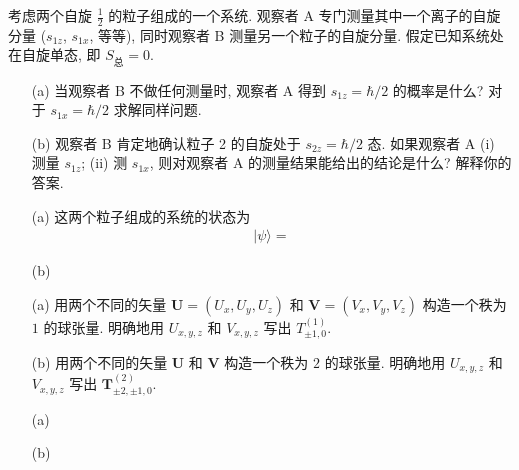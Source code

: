 \documentclass{assignment}
\begin{document}
\begin{prob}[课本习题 3.28]
    考虑两个自旋 $\frac{1}{2}$ 的粒子组成的一个系统. 观察者 A 专门测量其中一个离子的自旋分量 ($s_{1z}$, $s_{1x}$, 等等), 同时观察者 B 测量另一个粒子的自旋分量. 假定已知系统处在自旋单态, 即 $S_{\text{总}}=0$.
    \begin{itemize}
        \item[(a)] 当观察者 B 不做任何测量时, 观察者 A 得到 $s_{1z}=\hbar/2$ 的概率是什么? 对于 $s_{1x}=\hbar/2$ 求解同样问题.
        \item[(b)] 观察者 B 肯定地确认粒子 2 的自旋处于 $s_{2z}=\hbar/2$ 态. 如果观察者 A (i) 测量 $s_{1z}$; (ii) 测 $s_{1x}$, 则对观察者 A 的测量结果能给出的结论是什么? 解释你的答案.
    \end{itemize}
\end{prob}
\begin{sol}
    \begin{itemize}
        \item[(a)] 这两个粒子组成的系统的状态为
        \begin{align}
            \lvert\psi\rangle=
        \end{align}
        \item[(b)] 
    \end{itemize}
\end{sol}

\begin{prob}[课本习题 3.30]
    \begin{itemize}
        \item[(a)] 用两个不同的矢量 $\bm{U}=(U_x,U_y,U_z)$ 和 $\bm{V}=(V_x,V_y,V_z)$ 构造一个秩为 $1$ 的球张量. 明确地用 $U_{x,y,z}$ 和 $V_{x,y,z}$ 写出 $T_{\pm 1,0}^{(1)}$.
        \item[(b)] 用两个不同的矢量 $\bm{U}$ 和 $\bm{V}$ 构造一个秩为 $2$ 的球张量. 明确地用 $U_{x,y,z}$ 和 $V_{x,y,z}$ 写出 $\bm{T}_{\pm 2,\pm 1,0}^{(2)}$.
    \end{itemize}
\end{prob}
\begin{sol}
    \begin{itemize}
        \item[(a)] 
        \item[(b)] 
    \end{itemize}
\end{sol}
\end{document}
